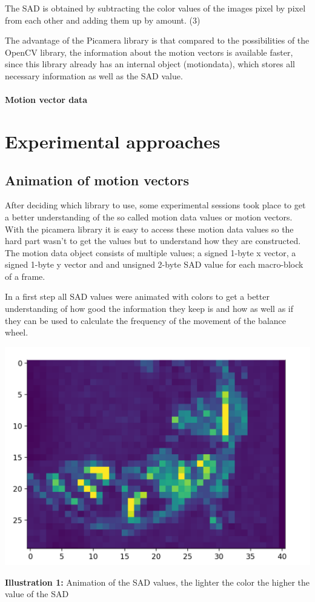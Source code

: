 \documentclass[12pt, a4paper]{report}
\begin{document}
The SAD is obtained by subtracting the color values of the images pixel by pixel from each other and adding them up by amount. (3)

The advantage of the Picamera library is that compared to the possibilities of the OpenCV library, the information about the motion vectors is available faster, since this library already has an internal object (motiondata), which stores all necessary information as well as the SAD value. 

\subsubsection{Motion vector data}

\chapter {Experimental approaches}
\section{Animation of motion vectors}
After deciding which library to use, some experimental sessions took place to get a better understanding of the so called motion data values or motion vectors. 
With the picamera library it is easy to access these motion data values so the hard part wasn't to get the values but to understand how they are constructed. 
The motion data object consists of multiple values; a signed 1-byte x vector, a signed 1-byte y vector and and unsigned 2-byte SAD value for each macro-block of a frame.

In a first step all SAD values were animated with colors to get a better understanding of how good the information they keep is and how as well as if they can be used to calculate the frequency of the movement of the balance wheel.

\bigskip

\noindent
\begin{center}
\includegraphics[scale=0.6]{Images/animation_sad.png}

{\bf Illustration 1:}  Animation of the SAD values, the lighter the color the higher the value of the SAD
\end{center}
\end{document}
